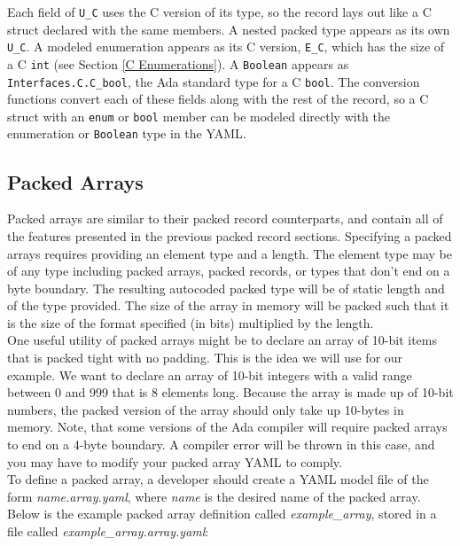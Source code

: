 Each field of \texttt{U\_C} uses the C version of its type, so the record lays out like a C struct declared with the same members. A nested packed type appears as its own \texttt{U\_C}. A modeled enumeration appears as its C version, \texttt{E\_C}, which has the size of a C \texttt{int} (see Section \ref{C Enumerations}). A \texttt{Boolean} appears as \texttt{Interfaces.C.C\_bool}, the Ada standard type for a C \texttt{bool}. The conversion functions convert each of these fields along with the rest of the record, so a C struct with an \texttt{enum} or \texttt{bool} member can be modeled directly with the enumeration or \texttt{Boolean} type in the YAML.

\subsection{Packed Arrays} \label{Packed Arrays}

Packed arrays are similar to their packed record counterparts, and contain all of the features presented in the previous packed record sections. Specifying a packed arrays requires providing an element type and a length. The element type may be of any type including packed arrays, packed records, or types that don't end on a byte boundary. The resulting autocoded packed type will be of static length and of the type provided. The size of the array in memory will be packed such that it is the size of the format specified (in bits) multiplied by the length. \\

One useful utility of packed arrays might be to declare an array of 10-bit items that is packed tight with no padding. This is the idea we will use for our example. We want to declare an array of 10-bit integers with a valid range between 0 and 999 that is 8 elements long. Because the array is made up of 10-bit numbers, the packed version of the array should only take up 10-bytes in memory. Note, that some versions of the Ada compiler will require packed arrays to end on a 4-byte boundary. A compiler error will be thrown in this case, and you may have to modify your packed array YAML to comply. \\

To define a packed array, a developer should create a YAML model file of the form \textit{name.array.yaml}, where \textit{name} is the desired name of the packed array. Below is the example packed array definition called \textit{example\_array}, stored in a file called \textit{example\_array.array.yaml}:

